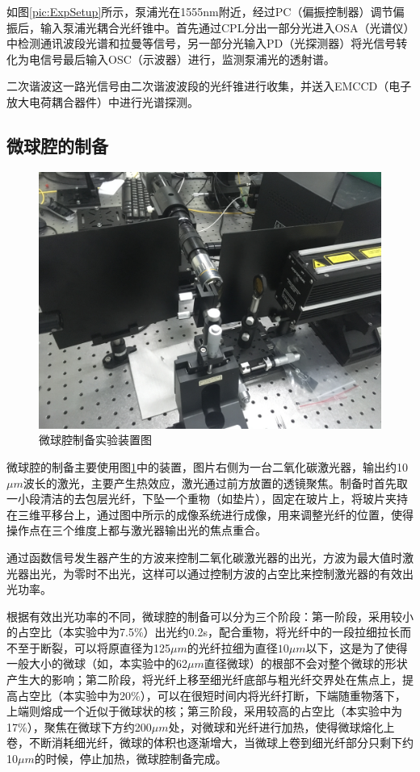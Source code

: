 \documentclass[UTF8,a4paper,cs4size,hyperref]{ctexart}
\begin{document}
如图\ref{pic:ExpSetup}所示，泵浦光在1555nm附近，经过PC（偏振控制器）调节偏振后，输入泵浦光耦合光纤锥中。首先通过CPL分出一部分光进入OSA（光谱仪）中检测通讯波段光谱和拉曼等信号，另一部分光输入PD（光探测器）将光信号转化为电信号最后输入OSC（示波器）进行，监测泵浦光的透射谱。

二次谐波这一路光信号由二次谐波波段的光纤锥进行收集，并送入EMCCD（电子放大电荷耦合器件）中进行光谱探测。

\subsection{微球腔的制备}

\begin{figure}
\centering
\includegraphics[width=16cm ]{Setup_makingSphere}
\caption{微球腔制备实验装置图}
\label{pic:Setup_makingSphere}
\end{figure}

微球腔的制备主要使用图\ref{pic:Setup_makingSphere}中的装置，图片右侧为一台二氧化碳激光器，输出约10$\mu m$波长的激光，主要产生热效应，激光通过前方放置的透镜聚焦。制备时首先取一小段清洁的去包层光纤，下坠一个重物（如垫片），固定在玻片上，将玻片夹持在三维平移台上，通过图中所示的成像系统进行成像，用来调整光纤的位置，使得操作点在三个维度上都与激光器输出光的焦点重合。

通过函数信号发生器产生的方波来控制二氧化碳激光器的出光，方波为最大值时激光器出光，为零时不出光，这样可以通过控制方波的占空比来控制激光器的有效出光功率。

根据有效出光功率的不同，微球腔的制备可以分为三个阶段：第一阶段，采用较小的占空比（本实验中为7.5\%）出光约0.2s，配合重物，将光纤中的一段拉细拉长而不至于断裂，可以将原直径为125$\mu m$的光纤拉细为直径$10\mu m$以下，这是为了使得一般大小的微球（如，本实验中的62$\mu m$直径微球）的根部不会对整个微球的形状产生大的影响；第二阶段，将光纤上移至细光纤底部与粗光纤交界处在焦点上，提高占空比（本实验中为20\%），可以在很短时间内将光纤打断，下端随重物落下，上端则熔成一个近似于微球状的核；第三阶段，采用较高的占空比（本实验中为17\%），聚焦在微球下方约200$\mu m$处，对微球和光纤进行加热，使得微球熔化上卷，不断消耗细光纤，微球的体积也逐渐增大，当微球上卷到细光纤部分只剩下约10$\mu m$的时候，停止加热，微球腔制备完成。
\end{document}
